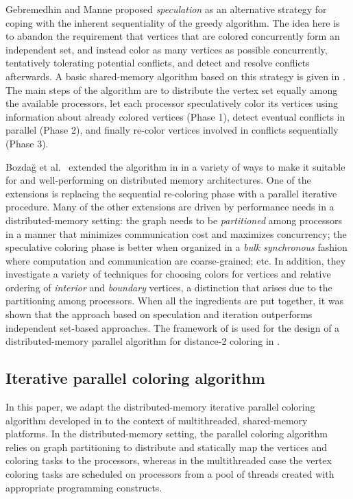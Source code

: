 \documentclass{article}
\begin{document}
Gebremedhin and Manne \cite{GM00} proposed {\em speculation} as an alternative
strategy for coping with the inherent sequentiality of the greedy algorithm.
The idea here is to abandon the requirement that vertices that are colored concurrently
form an independent set, and instead color as many vertices as possible concurrently,
tentatively tolerating potential conflicts, and detect and resolve conflicts afterwards.
A basic shared-memory algorithm based on this strategy is given in \cite{GM00}.
The main steps of the algorithm are to distribute the vertex set equally among the available processors, 
let each processor speculatively color its vertices using information about
already colored vertices (Phase 1), detect eventual conflicts in parallel (Phase 2), 
and finally re-color vertices involved in conflicts sequentially (Phase 3). 

Bozda\u{g} et al.~\cite{BGMBC08} extended the algorithm in \cite{GM00} in a variety of ways 
to make it suitable for and well-performing on distributed memory architectures. 
One of the extensions is replacing the sequential re-coloring phase with 
a parallel iterative procedure.
Many of the other extensions are driven by performance needs in a distributed-memory setting:
the graph needs to be {\em partitioned} among processors in a manner that minimizes
communication cost and maximizes concurrency;
the speculative coloring phase is better when organized in a {\em bulk synchronous} fashion
where computation and communication are coarse-grained; etc.
In addition, they investigate a variety of techniques for choosing colors 
for vertices and relative ordering of
{\em interior} and {\em boundary} vertices, a distinction that arises
due to the partitioning among processors. 
When all the ingredients are put together, it was shown that the 
approach based on speculation and iteration outperforms independent set-based approaches. 
The framework of \cite{BGMBC08} is used for the design of a distributed-memory parallel
algorithm for distance-2 coloring in \cite{BCGMBO:sisc}.

\subsection{Iterative parallel coloring algorithm}
\label{sec:iterative}

In this paper, we adapt the distributed-memory iterative parallel coloring algorithm 
developed in \cite{BGMBC08} to the context of multithreaded, shared-memory platforms.
In the distributed-memory setting, the parallel coloring algorithm relies on graph partitioning 
to distribute and statically map the vertices and coloring tasks to the processors, 
whereas in the multithreaded case the vertex coloring tasks are scheduled 
on processors from a pool of threads created with appropriate programming constructs.
\end{document}
